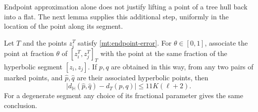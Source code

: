 Endpoint approximation alone does not justify lifting a point of a
tree hull back into a flat.  The next lemma supplies this additional
step, uniformly in the location of the point along its segment.

\begin{lemma}\label{mt:segment-comparison}
Let \(T\) and the points \(z_i^T\) satisfy
\eqref{mt:endpoint-error}.  For \(\theta\in[0,1]\), associate the
point at fraction \(\theta\) of \([z_i^T,z_j^T]_T\) with the point
at the same fraction of the hyperbolic segment \([z_i,z_j]\).
If \(p,q\) are obtained in this way, from any two pairs of marked
points, and \(\widehat p,\widehat q\) are their associated hyperbolic
points, then
\begin{equation}\label{mt:segment-error}
 \bigl|d_{\mathbb H}(\widehat p,\widehat q)-d_T(p,q)\bigr|
 \le 11K(\ell+2).
\end{equation}
For a degenerate segment any choice of its fractional parameter gives
the same conclusion.
\end{lemma}
